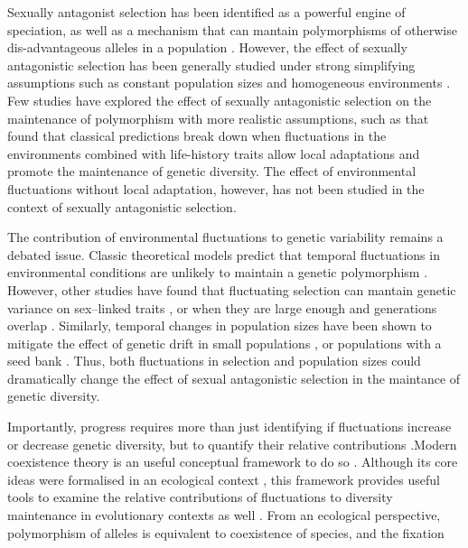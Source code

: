 \documentclass[12pt]{article}
\begin{document}
Sexually antagonist selection has been identified as a powerful engine of speciation, as well as a mechanism that can mantain polymorphisms of otherwise dis-advantageous alleles in a population  \citep{gavrilets2014sexual}. However, the effect of sexually antagonistic selection has been generally studied under strong simplifying assumptions such as  constant population sizes and homogeneous environments \citep{kidwell1977regions, pamilo1979genic}. Few studies have explored the effect of sexually antagonistic selection on the maintenance of polymorphism with more realistic assumptions, such as \citet{connallon_evolutionary_2018} that found that classical predictions break down when fluctuations in the environments combined with life-history traits allow local adaptations and promote the maintenance of genetic diversity. The effect of environmental fluctuations without local adaptation, however, has not been studied in the context of sexually antagonistic selection.


The contribution of environmental fluctuations to genetic variability remains a debated issue. Classic theoretical models predict that temporal fluctuations in environmental conditions are unlikely to maintain a genetic polymorphism \citep{hedrick1974genetic,hedrick1986genetic}. However, other studies have found that fluctuating selection can mantain genetic variance on sex--linked traits \citep{reinhold2000maintenance}, or when they are large enough and generations overlap \citep{ellner1994role, ellner1996patterns}. Similarly, temporal changes in population sizes have been shown to mitigate the effect of genetic drift in  small populations \citep{pemberton1996maintenance}, or populations with a seed bank \citep{nunney2002effective}. Thus, both fluctuations in selection and population sizes could dramatically change the effect of sexual antagonistic selection in the maintance of genetic diversity.


Importantly, progress requires more than just identifying if fluctuations increase or decrease genetic diversity, but to quantify their relative contributions \citep{ellner2016quantify}.Modern coexistence theory is an useful conceptual framework to do so \citep{Chesson2000, mayfield2010opposing,hillerislambers2012rethinking, Adleretal2018, petry2018competition}. Although its core ideas were formalised in an ecological context \citep{chesson1994multispecies,chesson2000general}, this framework provides useful tools to examine the relative contributions of fluctuations to diversity maintenance  in evolutionary contexts as well \citep{ellner1996patterns,reinhold2000maintenance}. From an ecological perspective, polymorphism of alleles is equivalent to coexistence of species, and the fixation
\end{document}
